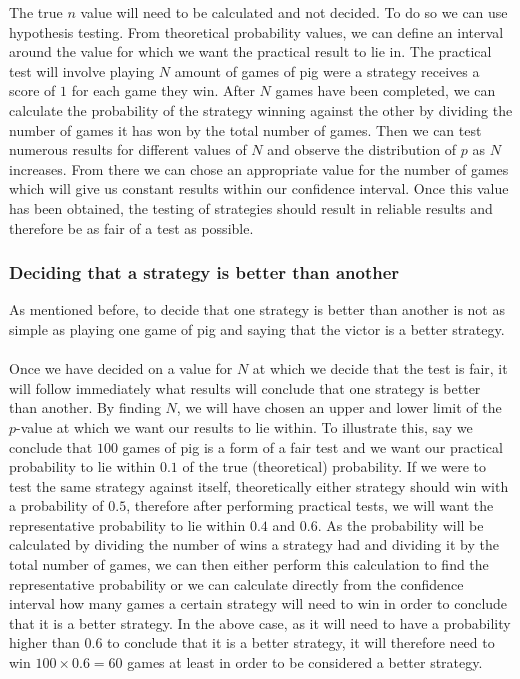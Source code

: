 \documentclass[a4paper,titlepage]{article}
\begin{document}
The true $n$ value will need to be calculated and not decided. To do so we can use hypothesis testing. From theoretical probability values, we can define an interval around the value for which we want the practical result to lie in. The practical test will involve playing $N$ amount of games of pig were a strategy receives a score of $1$ for each game they win. After $N$ games have been completed, we can calculate the probability of the strategy winning against the other by dividing the number of games it has won by the total number of games. Then we can test numerous results for different values of $N$ and observe the distribution of $p$ as $N$ increases. From there we can chose an appropriate value for the number of games which will give us constant results within our confidence interval. Once this value has been obtained, the testing of strategies should result in reliable results and therefore be as fair of a test as possible.
 \subsubsection{Deciding that a strategy is better than another}
As mentioned before, to decide that one strategy is better than another is not as simple as playing one game of pig and saying that the victor is a better strategy.\\ \\
Once we have decided on a value for $N$ at which we decide that the test is fair, it will follow immediately what results will conclude that one strategy is better than another. By finding $N$, we will have chosen an upper and lower limit of the $p$-value at which we want our results to lie within. To illustrate this, say we conclude that $100$ games of pig is a form of a fair test and we want our practical probability to lie within $0.1$ of the true (theoretical) probability. If we were to test the same strategy against itself, theoretically either strategy should win with a probability of $0.5$, therefore after performing practical tests, we will want the representative probability to lie within $0.4$ and $0.6$. As the probability will be calculated by dividing the number of wins a strategy had and dividing it by the total number of games, we can then either perform this calculation to find the representative probability or we can calculate directly from the confidence interval how many games a certain strategy will need to win in order to conclude that it is a better strategy. In the above case, as it will need to have a probability higher than $0.6$ to conclude that it is a better strategy, it will therefore need to win $100\times0.6=60$ games at least in order to be considered a better strategy. 
\end{document}
